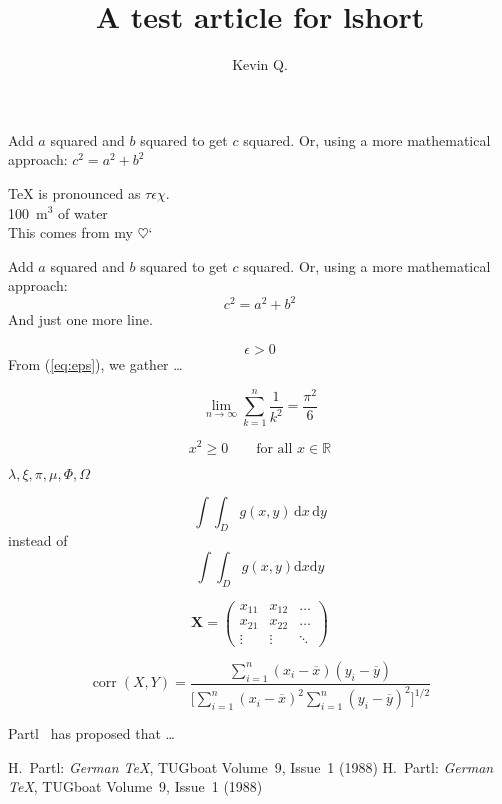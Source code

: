 \documentclass[10pt,a4paper]{article}
\author{Kevin Q.}
\title{A test article for lshort}
\begin{document}
Add $a$ squared and $b$ squared
to get $c$ squared. Or, using
a more mathematical approach:
$c^{2}=a^{2}+b^{2}$

\TeX{} is pronounced as
$\tau\epsilon\chi$.\\[6pt]
100~m$^{3}$ of water\\[6pt]
This comes from my $\heartsuit$`

Add $a$ squared and $b$ squared
to get $c$ squared. Or, using
a more mathematical approach:
\begin{displaymath}
c^{2}=a^{2}+b^{2}
\end{displaymath}
And just one more line.

\begin{equation} \label{eq:eps}
\epsilon > 0
\end{equation}
From (\ref{eq:eps}), we gather
\ldots

\begin{displaymath}
\lim_{n \to \infty}
\sum_{k=1}^n \frac{1}{k^2}
= \frac{\pi^2}{6}
\end{displaymath}

\begin{displaymath}
x^{2} \geq 0\qquad
\textrm{for all }x\in\mathbb{R}
\end{displaymath}

$\lambda,\xi,\pi,\mu,\Phi,\Omega$

\newcommand{\ud}{\mathrm{d}}
\begin{displaymath}
\int\!\!\!\int_{D} g(x,y)
\, \ud x\, \ud y
\end{displaymath}
instead of
\begin{displaymath}
\int\int_{D} g(x,y)\ud x \ud y
\end{displaymath}

\begin{displaymath}
\mathbf{X} =
\left( \begin{array}{ccc}
x_{11} & x_{12} & \ldots \\
x_{21} & x_{22} & \ldots \\
\vdots & \vdots & \ddots
\end{array} \right)
\end{displaymath}

\begin{displaymath}
\mathop{\mathrm{corr}}(X,Y)=
\frac{\displaystyle
\sum_{i=1}^n(x_i-\overline x)
(y_i-\overline y)}
{\displaystyle\biggl[
\sum_{i=1}^n(x_i-\overline x)^2
\sum_{i=1}^n(y_i-\overline y)^2
\biggr]^{1/2}}
\end{displaymath}

Partl~\cite{pa} has
proposed that \ldots

\begin{thebibliography}{99}
 H.~Partl:
\emph{German \TeX},
TUGboat Volume~9, Issue~1 (1988)
 H.~Partl:
\emph{German \TeX},
TUGboat Volume~9, Issue~1 (1988)
\end{thebibliography}
\end{document}
